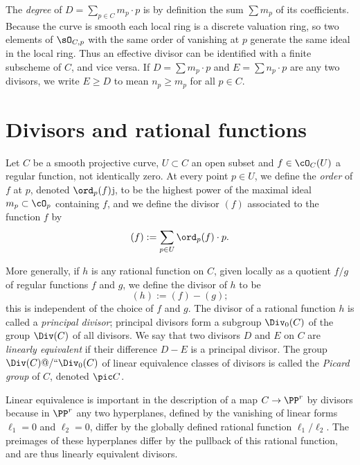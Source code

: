 The \emph{degree} of  $D = \sum_{p\in C} m_p\cdot p$ is by definition
%
the sum $\sum m_p$ of its coefficients. Because the curve is smooth
each local ring is a discrete valuation ring, so two elements of 
$\sO_{C,p}$ with the same order of vanishing at $p$ generate the same ideal in the local ring. Thus an effective divisor 
can be identified with a finite subscheme of $C$, and vice versa. If $D = \sum m_p\cdot p$ and $E = \sum n_p\cdot p$ are any two divisors, we write $E \geq D$ to mean $n_p \geq m_p$ for all $p \in C$.


\section{Divisors and rational functions}

Let $C$ be a smooth projective curve, $U \subset C$ an open subset and
$f \in \cO_C(U)$ a regular function, not identically zero. At every
point $p \in U$, we define the \emph{order} of $f$ at $p$, denoted
%
%
$\ord_p(f)$j,
to be the highest power of the maximal ideal $m_p \subset
\cO_p$ containing $f$, and we define the divisor $(f)$ associated to
%
the function $f$ by 
$$
(f) := \sum_{p \in U} \ord_p(f) \cdot p.
$$

More generally, if $h$ is any rational function on $C$, given locally as a quotient $f/g$ of regular functions $f$ and $g$, we define the divisor of $h$ to be
$$
(h) := (f) - (g);
$$
%
this is independent of the choice of $f$ and $g$. The divisor of a
%
rational function $h$ is called a \emph{principal divisor}; principal
divisors form a subgroup $\Div_0(C)$ of the group $\Div(C)$ of all
divisors. We say that two divisors $D$ and $E$ on $C$ are
\emph{linearly equivalent} if their difference $D-E$ is a principal
divisor. The group $\Div(C)@/` `\Div_0(C)$ of linear equivalence classes 
%
of divisors is called the \emph{Picard group} of $C$, denoted
%
$\pic C$.

Linear equivalence
%
is important in the description of a map $C\to \PP^{r}$ by divisors
because in $\PP^{r}$ any two hyperplanes, defined by the vanishing of linear forms  $\ell_{1}=0$ and $\ell_{2}=0$, differ by the globally defined rational
function $\ell_{1}/\ell_{2}$. The preimages of these hyperplanes
differ by the 
pullback of this rational function,
and are thus linearly equivalent divisors.

